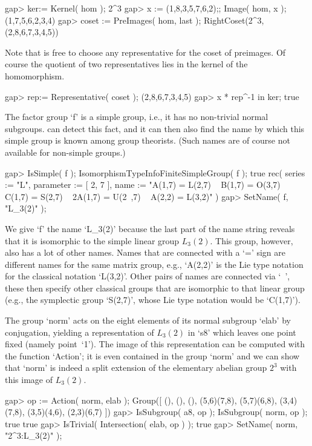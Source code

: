 \beginexample
gap> ker:= Kernel( hom );
2^3
gap> x := (1,8,3,5,7,6,2);; Image( hom, x );
(1,7,5,6,2,3,4)
gap> coset := PreImages( hom, last );
RightCoset(2^3,(2,8,6,7,3,4,5))
\endexample

Note that {\GAP} is free to choose any representative for the coset
of preimages.
Of course the quotient of two representatives lies in the kernel of
the homomorphism.

\beginexample
gap> rep:= Representative( coset );
(2,8,6,7,3,4,5)
gap> x * rep^-1 in ker;
true
\endexample

The factor  group `f'  is  a simple  group,  i.e., it has  no non-trivial
normal subgroups. {\GAP} can detect this fact,  and it can then also find
the name by which this simple group is known among group theorists. (Such
names are of course not available for non-simple groups.)

\beginexample
gap> IsSimple( f ); IsomorphismTypeInfoFiniteSimpleGroup( f );
true
rec( series := "L", parameter := [ 2, 7 ], 
  name := "A(1,7) = L(2,7) ~ B(1,7) = O(3,7) ~ C(1,7) = S(2,7) ~ 2A(1,7) = U(2\
,7) ~ A(2,2) = L(3,2)" )
gap> SetName( f, "L_3(2)" );
\endexample

We give `f' the name  `L_3(2)' because the  last part of the name  string
reveals that  it is isomorphic to  the simple linear group $L_3(2)$. This
group, however, also has a  lot of other  names. Names that are connected
with a  `=' sign  are different names   for the same matrix group,  e.g.,
`A(2,2)' is the  Lie type notation for  the  classical notation `L(3,2)'.
Other pairs  of  names are  connected via `~',  these then  specify other
classical  groups  that are isomorphic  to that  linear  group (e.g., the
symplectic group `S(2,7)', whose Lie type notation would be `C(1,7)').

The group `norm' acts on the eight elements of its normal subgroup `elab'
by conjugation,  yielding  a representation   of $L_3(2)$ in   `s8' which
leaves one    point  fixed  (namely  point~`1').    The   image of   this
representation can be computed with the function  `Action'; it is even
contained  in the group `norm' and  we can show  that `norm'  is indeed a
split extension of the elementary abelian group $2^3$  with this image of
$L_3(2)$.

\beginexample
gap> op := Action( norm, elab );
Group([ (), (), (), (5,6)(7,8), (5,7)(6,8), (3,4)(7,8), (3,5)(4,6), 
  (2,3)(6,7) ])
gap> IsSubgroup( a8, op ); IsSubgroup( norm, op );
true
true
gap> IsTrivial( Intersection( elab, op ) );
true
gap> SetName( norm, "2^3:L_3(2)" );
\endexample

